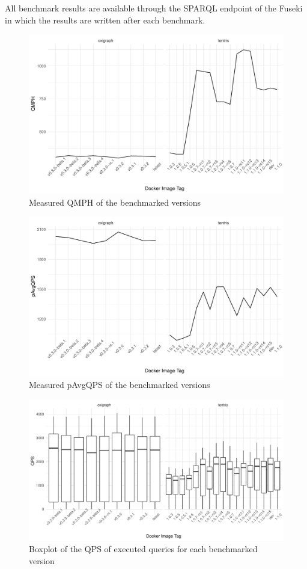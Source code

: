 All benchmark results are available through the SPARQL endpoint of the Fuseki \ts{} in which the results are written after each benchmark.

\begin{figure}[tbph]
	\centering
	\includegraphics[width=.8\textwidth]{figures/QMPH.pdf}
	\caption{Measured QMPH of the benchmarked \ts{} versions}
	\label{fig:QMPH}
\end{figure}

\begin{figure}[tbph]
	\centering
	\includegraphics[width=.8\textwidth]{figures/pAvgQPS.pdf}
	\caption{Measured pAvgQPS of the benchmarked \ts{} versions}
	\label{fig:pAvgQPS}
\end{figure}

\begin{figure}[tbph]
	\centering
	\includegraphics[width=.9\textwidth]{figures/qps.pdf}
	\caption{Boxplot of the QPS of executed queries for each benchmarked \ts{} version}
	\label{fig:qps}
\end{figure}



